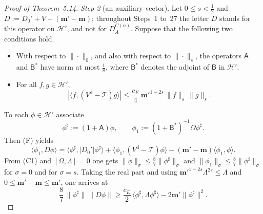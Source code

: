 \documentclass[11pt]{amsart}
\theoremstyle{definition}
\begin{document}
\begin{proof}[Proof of Theorem~5.14]
\emph{Step 2} (an auxiliary vector).
Let $0\le s<\frac12$ and $D:=D_0'+V-(\mathbf m'-\mathbf m)$;
throughout Steps~1 to~27 the letter $D$ stands for this operator on $\mathcal H'$, and not for $D^{C(n)}_A$.
Suppose that the following two conditions hold.
\begin{itemize}
\item[\textbf{(C1)}] With respect to $\|\cdot\|_0$, and also with respect to $\|\cdot\|_s$, the operators $\mathsf A$ and $\mathsf B^*$ have norm at most $\frac18$, where $\mathsf B^*$ denotes the adjoint of $\mathsf B$ in $\mathcal H'$.
\item[\textbf{(C2)}] For all $f,g\in\mathcal H'$,
\begin{equation*}
|\langle f,(V^{\mathrm d}-\mathcal T)g\rangle|\le\frac{c_E}{4}\,\mathbf m'^{1-2s}\,\|f\|_s\,\|g\|_s.
\end{equation*}
\end{itemize}
To each $\phi\in\mathcal H'$ associate
\begin{equation*}
\phi^\sharp:=(1+\mathsf A)\phi,\qquad\phi_1:=(1+\mathsf B^*)^{-1}\Omega\phi^\sharp.
\end{equation*}
Then (F) yields
\begin{equation*}
\langle\phi_1,D\phi\rangle=\langle\phi^\sharp,|D_0'|\phi^\sharp\rangle+\langle\phi_1,(V^{\mathrm d}-\mathcal T)\phi\rangle-(\mathbf m'-\mathbf m)\langle\phi_1,\phi\rangle.
\end{equation*}
From (C1) and $[\Omega,\Lambda]=0$ one gets $\|\phi\|_\sigma\le\frac87\|\phi^\sharp\|_\sigma$ and $\|\phi_1\|_\sigma\le\frac87\|\phi^\sharp\|_\sigma$ for $\sigma=0$ and for $\sigma=s$.
Taking the real part and using $\mathbf m'^{1-2s}\Lambda^{2s}\le\Lambda$ and $0\le\mathbf m'-\mathbf m\le\mathbf m'$, one arrives at
\begin{equation*}
\frac87\,\|\phi^\sharp\|\,\|D\phi\|\ge\frac{c_E}{2}\,\langle\phi^\sharp,\Lambda\phi^\sharp\rangle-2\mathbf m'\|\phi^\sharp\|^2.
\end{equation*}


\end{proof}
\end{document}
